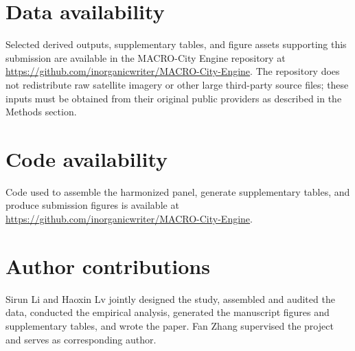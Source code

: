 \documentclass[oneside,pdflatex,sn-nature]{sn-jnl}
\begin{document}
\section*{Data availability}
Selected derived outputs, supplementary tables, and figure assets supporting this submission are available in the MACRO-City Engine repository at \url{https://github.com/inorganicwriter/MACRO-City-Engine}. The repository does not redistribute raw satellite imagery or other large third-party source files; these inputs must be obtained from their original public providers as described in the Methods section.

\section*{Code availability}
Code used to assemble the harmonized panel, generate supplementary tables, and produce submission figures is available at \url{https://github.com/inorganicwriter/MACRO-City-Engine}.

\section*{Author contributions}
Sirun Li and Haoxin Lv jointly designed the study, assembled and audited the data, conducted the empirical analysis, generated the manuscript figures and supplementary tables, and wrote the paper. Fan Zhang supervised the project and serves as corresponding author.
\end{document}
